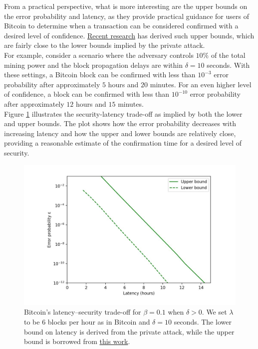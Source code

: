 From a practical perspective, what is more interesting are the upper bounds on the error probability and latency, as they provide practical guidance for users of Bitcoin to determine when a transaction can be considered confirmed with a desired level of confidence. \href{https://arxiv.org/pdf/2011.14051.pdf}{Recent research} has derived such upper bounds, which are fairly close to the lower bounds implied by the private attack.\\
For example, consider a scenario where the adversary controls $10\%$ of the total mining power and the block propagation delays are within $\delta = 10$ seconds. With these settings, a Bitcoin block can be confirmed with less than $10^{-3}$ error probability after approximately $5$ hours and $20$ minutes. For an even higher level of confidence, a block can be confirmed with less than $10^{-10}$ error probability after approximately $12$ hours and $15$ minutes.\\
Figure \ref{fig:f2} illustrates the security-latency trade-off as implied by both the lower and upper bounds. The plot shows how the error probability decreases with increasing latency and how the upper and lower bounds are relatively close, providing a reasonable estimate of the confirmation time for a desired level of security.
\begin{center}
    \begin{figure}
        \centering
        \includegraphics[width=0.8\linewidth]{Fig/09/F2}
        \caption{Bitcoin’s latency–security trade-oﬀ for $\beta = 0.1$ when $\delta > 0$. We set $\lambda$ to be $6$ blocks per hour as in Bitcoin and $\delta = 10$ seconds. The lower bound on latency is derived from the private attack, while the upper bound is borrowed from \href{https://arxiv.org/pdf/2011.14051.pdf}{this work}.}
        \label{fig:f2}
    \end{figure}
\end{center}
